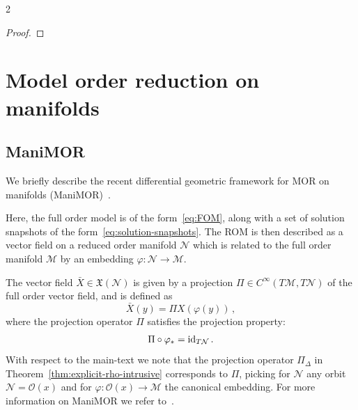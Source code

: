 \documentclass{article}
\newtheorem{proof}{Proof}[theorem]
\newcommand{\M}{\mathcal{M}}                                %
\newcommand{\X}{\mathfrak{X}}                               %
\newcommand{\appX}{\bar{X}}
\newcommand{\state}{x}
\newcommand{\stateb}{y}
\begin{document}
\begin{multicols}{2}
\begin{proof}
    
\end{proof}
 
\section{Model order reduction on manifolds}\label{sec:manimor}


\subsection{ManiMOR}
We briefly describe the recent differential geometric framework for MOR on manifolds (ManiMOR)~\cite{Buchfink2023a}.

Here, the full order model is of the form~\eqref{eq:FOM}, along with a set of solution snapshots of the form~\eqref{eq:solution-snapshots}. The ROM is then described as a vector field on a reduced order manifold $\mathcal{N}$ which is related to the full order manifold $\mathcal{M}$ by an embedding $\varphi:\mathcal{N}\rightarrow\mathcal{M}$. 

The vector field $\appX\in\X(\mathcal{N})$ is given by a projection $\Pi \in C^\infty(T\M,T\mathcal{N})$ of the full order vector field, and is defined as
\begin{equation}
    \appX(\stateb) = \Pi X(\varphi(\stateb))\,,
\end{equation}
where the projection operator $\Pi$ satisfies the projection property:
\begin{equation}
    \Pi \circ \varphi_* = \textnormal{id}_{T\mathcal{N}}  \,.
\end{equation}
With respect to the main-text we note that the projection operator $\Pi_\Delta$ in Theorem~\ref{thm:explicit-rho-intrusive} corresponds to $\Pi$, picking for $\mathcal{N}$ any orbit $\mathcal{N} = \mathcal{O}(\state)$ and for $\varphi:\mathcal{O}(\state) \rightarrow \M$ the canonical embedding. 
For more information on ManiMOR we refer to~\cite{Buchfink2023a}.



\end{multicols}
\end{document}
